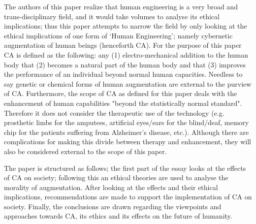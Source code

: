 The authors of this paper realize that human engineering is a very broad and trans-disciplinary field, and it would take volumes to analyse its ethical implications; thus this paper attempts to narrow the field by only looking at the ethical implications of one form of ‘Human Engineering’; namely cybernetic augmentation of human beings (henceforth CA). For the purpose of this paper CA is defined as the following: any (1) electro-mechanical addition to the human body that (2) becomes a natural part of the human body and that (3) improves the performance of an individual beyond normal human capacities. Needless to say genetic or chemical forms of human augmentation are external to the purview of CA. Furthermore, the scope of CA as defined for this paper deals with the enhancement of human capabilities "beyond the statistically normal standard". Therefore it does not consider the therapeutic use of the technology (e.g. prosthetic limbs for the amputees, artificial eyes/ears for the blind/deaf, memory chip for the patients suffering from Alzheimer's disease, etc.). Although there are complications for making this divide between therapy and enhancement, they will also be considered external to the scope of this paper.

The paper is structured as follows; the first part of the essay looks at the effects of CA on society; following this an ethical theories are used to analyse the morality of augmentation. After looking at the effects and their ethical implications, recommendations are made to support the implementation of CA on society. Finally, the conclusions are drawn regarding the viewpoints and approaches towards CA, its ethics and its effects on the future of humanity.